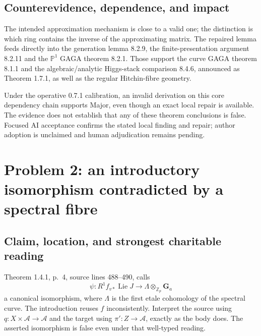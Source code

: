 \documentclass[10pt]{article}
\begin{document}
\subsection*{Counterevidence, dependence, and impact}
The intended approximation mechanism is close to a valid one; the distinction is which ring contains the inverse of the approximating matrix. The repaired lemma feeds directly into the generation lemma 8.2.9, the finite-presentation argument 8.2.11 and the \(\mathbb P^1\) GAGA theorem 8.2.1. Those support the curve GAGA theorem 8.1.1 and the algebraic/analytic Higgs-stack comparison 8.4.6, announced as Theorem 1.7.1, as well as the regular Hitchin-fibre geometry.\par
Under the operative 0.7.1 calibration, an invalid derivation on this core dependency chain supports Major, even though an exact local repair is available. The evidence does not establish that any of these theorem conclusions is false. Focused AI acceptance confirms the stated local finding and repair; author adoption is unclaimed and human adjudication remains pending.\par
\section*{Problem 2: an introductory isomorphism contradicted by a spectral fibre}
\subsection*{Claim, location, and strongest charitable reading}
Theorem 1.4.1, p. 4, source lines 488–490, calls \[\psi:R^1 f_{v*}\operatorname{Lie}J\longrightarrow\Lambda\otimes_{\mathbb Z_p}\mathbf G_a\] a canonical isomorphism, where \(\Lambda\) is the first etale cohomology of the spectral curve. The introduction reuses \(f\) inconsistently. Interpret the source using \(q:X\times\mathcal A\to\mathcal A\) and the target using \(\pi':Z\to\mathcal A\), exactly as the body does. The asserted isomorphism is false even under that well-typed reading.\par
\end{document}
